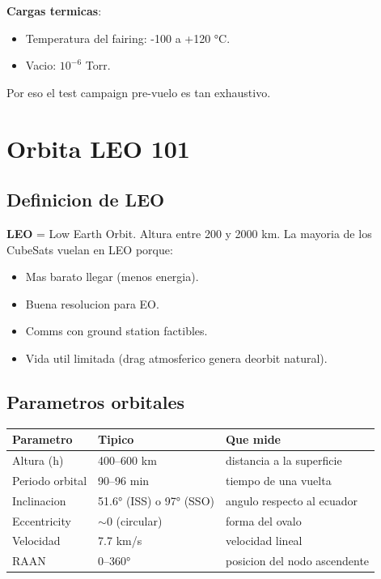 \documentclass[11pt,a4paper,oneside,openright]{book}
\begin{document}
\textbf{Cargas termicas}:
\begin{itemize}[leftmargin=2em]
  \item Temperatura del fairing: -100 a +120 °C.
  \item Vacio: $10^{-6}$ Torr.
\end{itemize}

Por eso el test campaign pre-vuelo es tan exhaustivo.

\chapter{Orbita LEO 101}
\label{ch:orbita}

\section{Definicion de LEO}

\textbf{LEO} = Low Earth Orbit. Altura entre 200 y 2000 km. La mayoria de
los CubeSats vuelan en LEO porque:
\begin{itemize}[leftmargin=2em]
  \item Mas barato llegar (menos energia).
  \item Buena resolucion para EO.
  \item Comms con ground station factibles.
  \item Vida util limitada (drag atmosferico genera deorbit natural).
\end{itemize}

\section{Parametros orbitales}

\begin{center}
\begin{tabular}{lll}
\toprule
\textbf{Parametro} & \textbf{Tipico} & \textbf{Que mide} \\
\midrule
Altura (h)              & 400--600 km   & distancia a la superficie \\
Periodo orbital         & 90--96 min    & tiempo de una vuelta \\
Inclinacion             & 51.6° (ISS) o 97° (SSO) & angulo respecto al ecuador \\
Eccentricity            & $\sim 0$ (circular) & forma del ovalo \\
Velocidad               & 7.7 km/s     & velocidad lineal \\
RAAN                    & 0--360°       & posicion del nodo ascendente \\
\bottomrule
\end{tabular}
\end{center}
\end{document}
